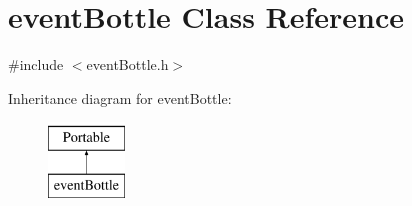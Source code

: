 \hypertarget{classeventBottle}{\section{event\-Bottle Class Reference}
\label{classeventBottle}
}


{\ttfamily \#include $<$event\-Bottle.\-h$>$}

Inheritance diagram for event\-Bottle\-:\begin{figure}[H]
\begin{center}
\leavevmode
\includegraphics[height=2.000000cm]{classeventBottle}
\end{center}
\end{figure}
